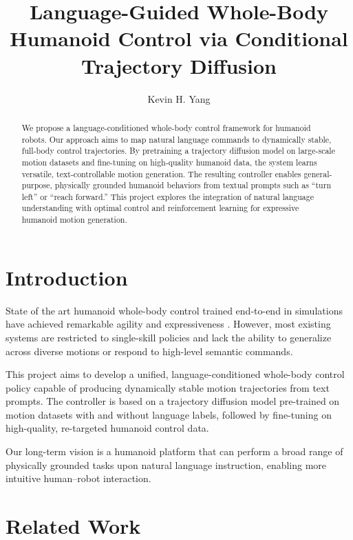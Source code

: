 \documentclass{article}
\title{Language-Guided Whole-Body Humanoid Control via Conditional Trajectory Diffusion}
\author{Kevin H. Yang}
\begin{document}
\maketitle

\begin{abstract}
We propose a language-conditioned whole-body control framework for humanoid robots.
Our approach aims to map natural language commands to dynamically stable, full-body control trajectories.
By pretraining a trajectory diffusion model on large-scale motion datasets and fine-tuning on high-quality humanoid data, the system learns versatile, text-controllable motion generation.
The resulting controller enables general-purpose, physically grounded humanoid behaviors from textual prompts such as “turn left” or “reach forward.”
This project explores the integration of natural language understanding with optimal control and reinforcement learning for expressive humanoid motion generation.
\end{abstract}

\section{Introduction}
State of the art humanoid whole-body control trained end-to-end in simulations have achieved remarkable agility and expressiveness 
\cite{liao2025beyondmimicmotiontrackingversatile, ji2024exbody2, cheng2024express, zhang2025falcon, li2025amo}.
However, most existing systems are restricted to single-skill policies and lack the ability to generalize across diverse motions or respond to high-level semantic commands.

This project aims to develop a unified, language-conditioned whole-body control policy capable of producing dynamically stable motion trajectories from text prompts. 
The controller is based on a trajectory diffusion model pre-trained on motion datasets with and without language labels, followed by fine-tuning on high-quality, re-targeted humanoid control data.

Our long-term vision is a humanoid platform that can perform a broad range of physically grounded tasks upon natural language instruction, enabling more intuitive human–robot interaction.

\section{Related Work}
\label{sec:related-work}
\end{document}
